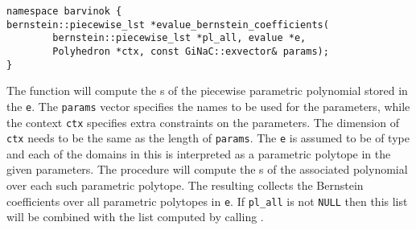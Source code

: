\begin{verbatim}
namespace barvinok {
bernstein::piecewise_lst *evalue_bernstein_coefficients(
	    bernstein::piecewise_lst *pl_all, evalue *e, 
	    Polyhedron *ctx, const GiNaC::exvector& params);
}
\end{verbatim}
The  function will compute the
s of the piecewise parametric polynomial stored in the
 \verb+e+.
The \verb+params+ vector specifies the names to be used for the parameters,
while the context  \verb+ctx+ specifies extra constraints
on the parameters.
The dimension of \verb+ctx+ needs to be the same as the length of \verb+params+.
The  \verb+e+ is assumed to be of type 
and each of the domains in this  is interpreted
as a parametric polytope in the given parameters. The procedure
will compute the s of the associated polynomial
over each such parametric polytope.
The resulting  collects the 
Bernstein coefficients over all parametric polytopes in \verb+e+.
If \verb+pl_all+ is not \verb+NULL+ then this list will be combined
with the list computed by calling .
